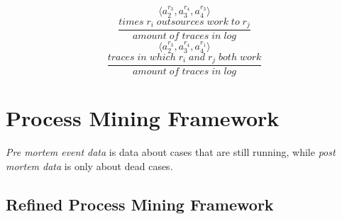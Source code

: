\documentclass[english]{panikzettel}
\begin{document}
\begin{halfboxr}
\[\langle a_2^{r_3},a_3^{r_4},a_4^{r_3} \rangle\]
\vspace{30pt}
\[\frac{times \; r_i \; outsources \; work \; to \; r_j}{amount \; of \; traces \; in \; log}\]
\vspace{20pt}
\[\langle a_2^{r_3},a_3^{r_4},a_4^{r_1} \rangle\]
\vspace{20pt}
\[\frac{traces \; in \; which \; r_i \; and \; r_j \; both \; work}{amount \; of \; traces \; in \; log}\]
\vspace{15pt}
\begin{center}
\end{center}
\end{halfboxr}


\vspace{-\baselineskip}
\section{Process Mining Framework}

\emph{Pre mortem event data} is data about cases that are still running, while \emph{post mortem data} is only about dead cases.

\subsection{Refined Process Mining Framework}
\end{document}
